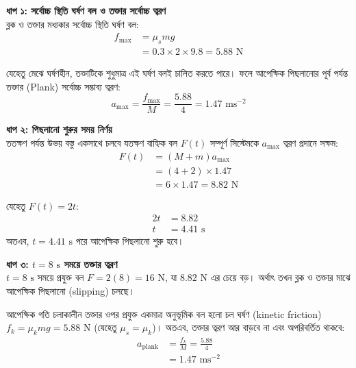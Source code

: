 \documentclass[12pt, a4paper]{article}
\begin{document}
\begin{tcolorbox}[solutionbox={সমাধান (Solution)}]
    \noindent
    \textbf{ধাপ ১: সর্বোচ্চ স্থিতি ঘর্ষণ বল ও তক্তার সর্বোচ্চ ত্বরণ} \\
    ব্লক ও তক্তার মধ্যকার সর্বোচ্চ স্থিতি ঘর্ষণ বল:
    \begin{align*}
        f_{\max} &= \mu_s m g \\
        &= 0.3 \times 2 \times 9.8 = 5.88\text{ N}
    \end{align*}
    
    যেহেতু মেঝে ঘর্ষণহীন, তক্তাটিকে শুধুমাত্র এই ঘর্ষণ বলই চালিত করতে পারে। ফলে আপেক্ষিক পিছলানোর পূর্ব পর্যন্ত তক্তার (Plank) সর্বোচ্চ সম্ভাব্য ত্বরণ:
    \[ a_{\max} = \frac{f_{\max}}{M} = \frac{5.88}{4} = 1.47\text{ ms}^{-2} \]
    
    \vspace{0.5em}
    \noindent\textbf{ধাপ ২: পিছলানো শুরুর সময় নির্ণয়} \\
    ততক্ষণ পর্যন্ত উভয় বস্তু একসাথে চলবে যতক্ষণ বাহ্যিক বল $F(t)$ সম্পূর্ণ সিস্টেমকে $a_{\max}$ ত্বরণ প্রদানে সক্ষম:
    \begin{align*}
        F(t) &= (M + m) a_{\max} \\
        &= (4 + 2) \times 1.47 \\
        &= 6 \times 1.47 = 8.82\text{ N}
    \end{align*}
    
    যেহেতু $F(t) = 2t$:
    \begin{align*}
        2t &= 8.82 \\
        t &= \mathbf{4.41}\text{ s}
    \end{align*}
    অতএব, $t = 4.41\text{ s}$ পরে আপেক্ষিক পিছলানো শুরু হবে।
    
    \vspace{0.5em}
    \noindent\textbf{ধাপ ৩: $t = 8\text{ s}$ সময়ে তক্তার ত্বরণ} \\
    $t = 8\text{ s}$ সময়ে প্রযুক্ত বল $F = 2(8) = 16\text{ N}$, যা $8.82\text{ N}$ এর চেয়ে বড়। অর্থাৎ তখন ব্লক ও তক্তার মাঝে আপেক্ষিক পিছলানো (slipping) চলছে।
    
    আপেক্ষিক গতি চলাকালীন তক্তার ওপর প্রযুক্ত একমাত্র অনুভূমিক বল হলো চল ঘর্ষণ (kinetic friction) $f_k = \mu_k m g = 5.88\text{ N}$ (যেহেতু $\mu_s = \mu_k$)।
    অতএব, তক্তার ত্বরণ আর বাড়বে না এবং অপরিবর্তিত থাকবে:
    \begin{align*}
        a_{\text{plank}} &= \frac{f_k}{M} = \frac{5.88}{4} \\
        &= \mathbf{1.47}\text{ ms}^{-2}
    \end{align*}
\end{tcolorbox}
\end{document}
